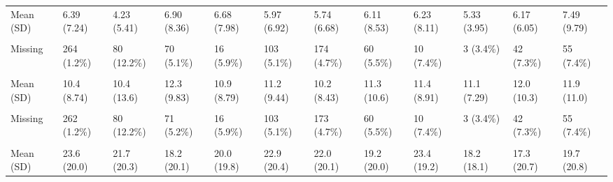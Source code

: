 \documentclass[
  single column]{article}
\begin{document}
\begin{landscape}
\begin{longtable}[t]{llllllllllll}
Mean (SD) & 6.39 (7.24) & 4.23 (5.41) & 6.90 (8.36) & 6.68 (7.98) & 5.97 (6.92) & 5.74 (6.68) & 6.11 (8.53) & 6.23 (8.11) & 5.33 (3.95) & 6.17 (6.05) & 7.49 (9.79)\\
\cellcolor{gray!10}{Median [Min, Max]} & \cellcolor{gray!10}{5.00 [0, 80.0]} & \cellcolor{gray!10}{3.00 [0, 50.0]} & \cellcolor{gray!10}{5.00 [0, 80.0]} & \cellcolor{gray!10}{5.00 [0, 80.0]} & \cellcolor{gray!10}{5.00 [0, 80.0]} & \cellcolor{gray!10}{4.00 [0, 80.0]} & \cellcolor{gray!10}{4.00 [0, 80.0]} & \cellcolor{gray!10}{5.00 [0, 80.0]} & \cellcolor{gray!10}{5.00 [0, 16.0]} & \cellcolor{gray!10}{5.00 [0, 36.0]} & \cellcolor{gray!10}{5.00 [0, 80.0]}\\
Missing & 264 (1.2\%) & 80 (12.2\%) & 70 (5.1\%) & 16 (5.9\%) & 103 (5.1\%) & 174 (4.7\%) & 60 (5.5\%) & 10 (7.4\%) & 3 (3.4\%) & 42 (7.3\%) & 55 (7.4\%)\\
\cellcolor{gray!10}{Hours of Housework per Week} & \cellcolor{gray!10}{} & \cellcolor{gray!10}{} & \cellcolor{gray!10}{} & \cellcolor{gray!10}{} & \cellcolor{gray!10}{} & \cellcolor{gray!10}{} & \cellcolor{gray!10}{} & \cellcolor{gray!10}{} & \cellcolor{gray!10}{} & \cellcolor{gray!10}{} & \cellcolor{gray!10}{}\\
\addlinespace
Mean (SD) & 10.4 (8.74) & 10.4 (13.6) & 12.3 (9.83) & 10.9 (8.79) & 11.2 (9.44) & 10.2 (8.43) & 11.3 (10.6) & 11.4 (8.91) & 11.1 (7.29) & 12.0 (10.3) & 11.9 (11.0)\\
\cellcolor{gray!10}{Median [Min, Max]} & \cellcolor{gray!10}{10.0 [0, 168]} & \cellcolor{gray!10}{7.00 [0, 168]} & \cellcolor{gray!10}{10.0 [0, 105]} & \cellcolor{gray!10}{10.0 [0, 80.0]} & \cellcolor{gray!10}{10.0 [0, 130]} & \cellcolor{gray!10}{8.00 [0, 168]} & \cellcolor{gray!10}{10.0 [0, 168]} & \cellcolor{gray!10}{10.0 [0, 40.0]} & \cellcolor{gray!10}{10.0 [0, 40.0]} & \cellcolor{gray!10}{10.0 [0, 100]} & \cellcolor{gray!10}{10.0 [0, 100]}\\
Missing & 262 (1.2\%) & 80 (12.2\%) & 71 (5.2\%) & 16 (5.9\%) & 103 (5.1\%) & 173 (4.7\%) & 60 (5.5\%) & 10 (7.4\%) & 3 (3.4\%) & 42 (7.3\%) & 55 (7.4\%)\\
\cellcolor{gray!10}{Hours Working per Week} & \cellcolor{gray!10}{} & \cellcolor{gray!10}{} & \cellcolor{gray!10}{} & \cellcolor{gray!10}{} & \cellcolor{gray!10}{} & \cellcolor{gray!10}{} & \cellcolor{gray!10}{} & \cellcolor{gray!10}{} & \cellcolor{gray!10}{} & \cellcolor{gray!10}{} & \cellcolor{gray!10}{}\\
Mean (SD) & 23.6 (20.0) & 21.7 (20.3) & 18.2 (20.1) & 20.0 (19.8) & 22.9 (20.4) & 22.0 (20.1) & 19.2 (20.0) & 23.4 (19.2) & 18.2 (18.1) & 17.3 (20.7) & 19.7 (20.8)\\

\end{longtable}
\end{landscape}
\end{document}
